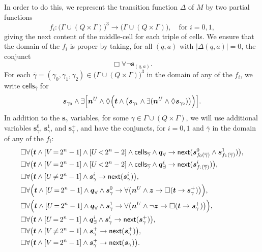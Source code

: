 \documentclass[10pt,a4paper]{amsart}
\theoremstyle{plain}
\theoremstyle{definition}
\newcommand{\fform}[1]{\boldsymbol{#1}}
\newcommand{\qvar}{\fform{q}}
\newcommand{\svar}{\fform{s}}
\newcommand{\Zvar}{\fform{z}}
\newcommand{\cell}{\mathsf{cells}}
\newcommand{\cU}{U}
\newcommand{\cV}{V}
\newcommand{\cvf}[3]{[{#1}\mathop{#2}{#3}]}
\newcommand{\inpww}{a}
\newcommand{\nextU}{\fform{n}^\cU}
\newcommand{\Bv}{\forall}
\newcommand{\Bh}{\Box}
\newcommand{\Dv}{\exists}
\newcommand{\Dh}{\Diamond}
\newcommand{\nextt}[1]{\mathsf{next}({#1})}
\newcommand{\tree}{\fform{t}}
\newcommand{\qA}{\qvar_\forall}
\newcommand{\qE}{\qvar_\exists}
\begin{document}
	In order to do this, we represent the transition function $\Delta$ of $M$
	by two partial functions
	\[
	f_i \colon\bigl(\Gamma\cup(Q\times\Gamma)\bigr)^3\to\bigl(\Gamma\cup(Q\times\Gamma)\bigr),\quad\mbox{for $i=0,1$},
	\] 
	giving the next content of the middle-cell for each triple of cells. 
	We ensure that the domain of the $f_i$ is proper by taking, for all $(q,\inpww)$ with $|\Delta(q,\inpww)|=0$, the conjunct
	\begin{equation}
		\label{accept}
		\Bh\Bv\neg\svar_{(q,\inpww)}.
	\end{equation}
	For each $\overline{\gamma}=(\gamma_0,\gamma_1,\gamma_2)\in \bigl(\Gamma\cup(Q\times\Gamma)\bigr)^3$ in the domain of any of the $f_i$, we write $\cell_{\overline{\gamma}}$ for
	\[
	\svar_{\gamma_0}\land\Dv\Bigl[\nextU\land\Dh\Bigl(\tree\land\bigl(\svar_{\gamma_1}\land\Dv(\nextU\land\Dh\svar_{\gamma_2})\bigr)\Bigr)\Bigr].
	\]
	In addition to the $\svar_\gamma$ variables,
	for some
	$\gamma\in\Gamma\cup(Q\times\Gamma)$, we will use
	additional variables $\svar_\gamma^0$, $\svar_\gamma^1$, and $\svar_\gamma^+$, and have the conjuncts,
	for $i=0,1$ and $\overline{\gamma}$ in the domain of any of the $f_i$:
	\begin{align}
		& \Bh\Bv\bigl(\tree\land\cvf{\cV}{=}{2^n-1}\land\cvf{\cU}{<}{2^n-2}\land\cell_{\overline{\gamma}}\land\qA 
		\to\nextt{\svar^0_{f_0(\overline{\gamma})}\land \svar^1_{f_1(\overline{\gamma})}}\bigr),\\
		& \Bh\Bv\bigl(\tree\land\cvf{\cV}{=}{2^n-1}\land\cvf{\cU}{<}{2^n-2}\land\cell_{\overline{\gamma}}\land\qE^i 
		\to\nextt{\svar^i_{f_i(\overline{\gamma})}}\bigr),\\
		& \Bh\Bv\bigl(\tree\land\cvf{\cU}{\ne}{2^n-1}\land\svar_\gamma^i\to\nextt{\svar_\gamma^i}\bigr),\\
		& \Bh\Bv\Bigl(\tree\land\cvf{\cU}{=}{2^n-1}\land\qA\land\svar_\gamma^0\to 
		\Bv\bigl(\nextU\land\Zvar\to\Bh(\tree\to\svar_\gamma^+)\bigr)\Bigr),\\
		& \Bh\Bv\Bigl(\tree\land\cvf{\cU}{=}{2^n-1}\land\qA\land\svar_\gamma^1\to 
		\Bv\bigl(\nextU\land\neg\Zvar\to\Bh(\tree\to\svar_\gamma^+)\bigr)\Bigr),\\
		& \Bh\Bv\bigl(\tree\land\cvf{\cU}{=}{2^n-1}\land\qE^i\land\svar_\gamma^i\to
		\nextt{\svar_\gamma^+}\bigr),\\
		& \Bh\Bv\bigl(\tree\land\cvf{\cV}{\ne}{2^n-1}\land\svar_\gamma^+\to
		\nextt{\svar_\gamma^+}\bigr),\\
		\label{treelast}
		& \Bh\Bv\bigl(\tree\land\cvf{\cV}{=}{2^n-1}\land\svar_\gamma^+\to
		\nextt{\svar_\gamma}\bigr).
	\end{align}
\end{document}
